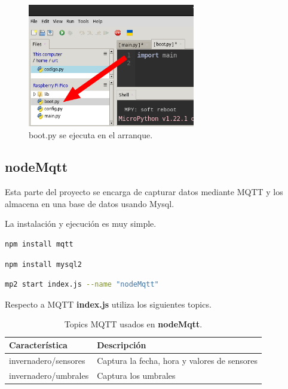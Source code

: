 \begin{figure}[h]
	\centering
	\includegraphics[width=0.65\textwidth]{img/desarrollo/thonny_boot.png}
	\caption{boot.py se ejecuta en el arranque.}
\end{figure}

\subsection{nodeMqtt}

Esta parte del proyecto se encarga de capturar datos mediante MQTT y los almacena en una base de datos usando Mysql. 

La instalación y ejecución es muy simple.

\begin{lstlisting}[language=sh, firstnumber=0, basicstyle=\normalsize, caption={Comando para instalar MQTT.js.}] 
npm install mqtt \end{lstlisting}

\begin{lstlisting}[language=sh, firstnumber=0, basicstyle=\normalsize, caption={Comando para instalar mysql para node.js.}] 
npm install mysql2\end{lstlisting}

\begin{lstlisting}[language=sh, firstnumber=0, basicstyle=\normalsize, caption={Ejecución.}] 
mp2 start index.js --name "nodeMqtt"\end{lstlisting}

Respecto a MQTT \textbf{index.js} utiliza los siguientes topics.

\begin{table}[htbp]
\begin{center}
\caption{Topics MQTT usados en \textbf{nodeMqtt}.}
\begin{tabular}{|l|l|} %
\hline
\rowcolor[HTML]{C0C0C0} 
\textbf{Característica} & \textbf{Descripción}\\ \hline
invernadero/sensores &  Captura la fecha, hora y valores de sensores\\ \hline
invernadero/umbrales & Captura los umbrales \\ \hline
\end{tabular}
\end{center}
\end{table}


